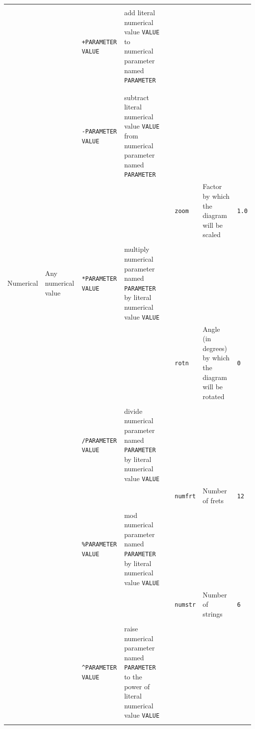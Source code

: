 \documentclass[12pt,letterpaper]{article}
\begin{document}
\begin{table}[H]
\begin{tabular}{|l|p{1.5cm}|l|p{2.5cm}|p{1pt}|l|p{2.5cm}|l|}
&&&&&&&\\
&&\texttt{+PARAMETER VALUE} & add literal numerical value \texttt{VALUE} to numerical parameter named \texttt{PARAMETER}&&&&\\
&&&&&&&\\
\cline{3-4}
&&&&&&&\\
&&\texttt{-PARAMETER VALUE} & subtract literal numerical value \texttt{VALUE} from numerical parameter named \texttt{PARAMETER}&&&&\\
&&&&&\texttt{zoom}&Factor by which the diagram will be scaled&\texttt{1.0}\\
\cline{3-4}
&&&&&&&\\
\cline{6-8}
Numerical & Any numerical value & \texttt{*PARAMETER VALUE} & multiply numerical parameter named \texttt{PARAMETER} by literal numerical value \texttt{VALUE}&&&&\\
&&&&&\texttt{rotn}&Angle (in degrees) by which the diagram will be rotated &\texttt{0}\\
\cline{3-4}
&&&&&&&\\
\cline{6-8}
&&\texttt{/PARAMETER VALUE} & divide numerical parameter named \texttt{PARAMETER} by literal numerical value \texttt{VALUE}&&&&\\
&&&&&\texttt{numfrt}& Number of frets &\texttt{12}\\
\cline{3-4}
&&&&&&&\\
\cline{6-8}
&&\texttt{\%PARAMETER VALUE} & mod numerical parameter named \texttt{PARAMETER} by literal numerical value \texttt{VALUE}&&&&\\
&&&&&\texttt{numstr}& Number of strings &\texttt{6}\\
\cline{3-4}
&&&&&&&\\
&&\texttt{\textasciicircum PARAMETER VALUE} & raise numerical parameter named \texttt{PARAMETER} to the power of literal numerical value \texttt{VALUE}&&&&\\
&&&&&&&\\

\hline


\end{tabular}
\end{table}
\end{document}
